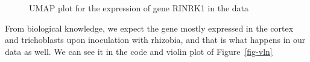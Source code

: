 \documentclass[
  letterpaper,
  DIV=11,
  numbers=noendperiod]{scrartcl}
\begin{document}
\begin{figure}[H]


\caption{\label{fig-rinrk}UMAP plot for the expression of gene RINRK1 in
the data}

\end{figure}%

From biological knowledge, we expect the gene mostly expressed in the
cortex and trichoblasts upon inoculation with rhizobia, and that is what
happens in our data as well. We can see it in the code and violin plot
of Figure~\ref{fig-vln}
\end{document}
